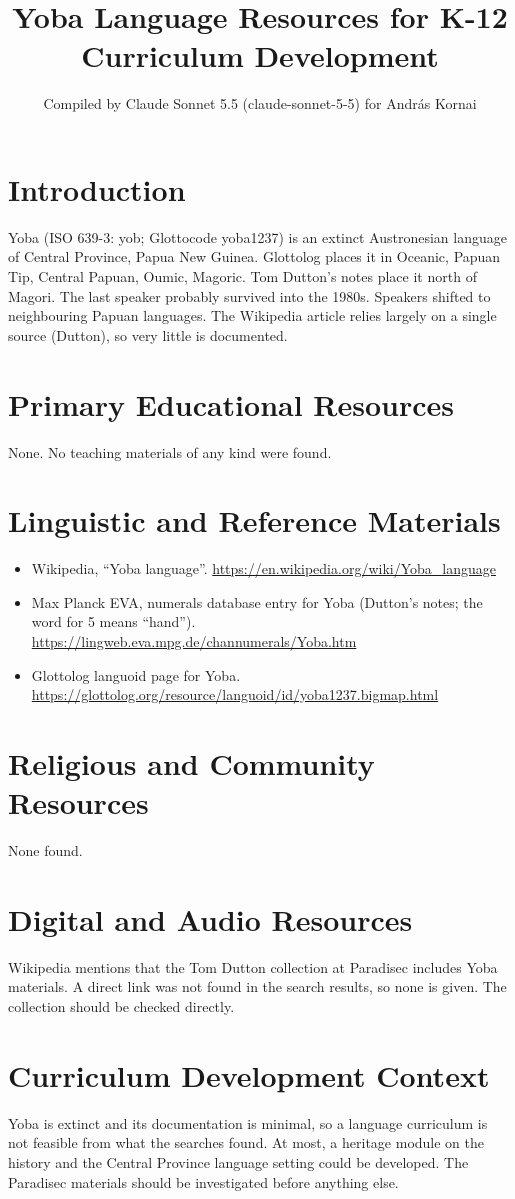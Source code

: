 \documentclass[12pt]{article}
\title{Yoba Language Resources for K-12 Curriculum Development}
\author{Compiled by Claude Sonnet 5.5 (claude-sonnet-5-5) for Andr\'as Kornai}
\date{}
\begin{document}
\maketitle

\section{Introduction}
Yoba (ISO 639-3: yob; Glottocode yoba1237) is an extinct Austronesian language of Central Province, Papua New Guinea. Glottolog places it in Oceanic, Papuan Tip, Central Papuan, Oumic, Magoric. Tom Dutton's notes place it north of Magori. The last speaker probably survived into the 1980s. Speakers shifted to neighbouring Papuan languages. The Wikipedia article relies largely on a single source (Dutton), so very little is documented.

\section{Primary Educational Resources}
None. No teaching materials of any kind were found.

\section{Linguistic and Reference Materials}
\begin{itemize}
\item Wikipedia, ``Yoba language''. \url{https://en.wikipedia.org/wiki/Yoba_language}
\item Max Planck EVA, numerals database entry for Yoba (Dutton's notes; the word for 5 means ``hand''). \url{https://lingweb.eva.mpg.de/channumerals/Yoba.htm}
\item Glottolog languoid page for Yoba. \url{https://glottolog.org/resource/languoid/id/yoba1237.bigmap.html}
\end{itemize}

\section{Religious and Community Resources}
None found.

\section{Digital and Audio Resources}
Wikipedia mentions that the Tom Dutton collection at Paradisec includes Yoba materials. A direct link was not found in the search results, so none is given. The collection should be checked directly.

\section{Curriculum Development Context}
Yoba is extinct and its documentation is minimal, so a language curriculum is not feasible from what the searches found. At most, a heritage module on the history and the Central Province language setting could be developed. The Paradisec materials should be investigated before anything else.
\end{document}
